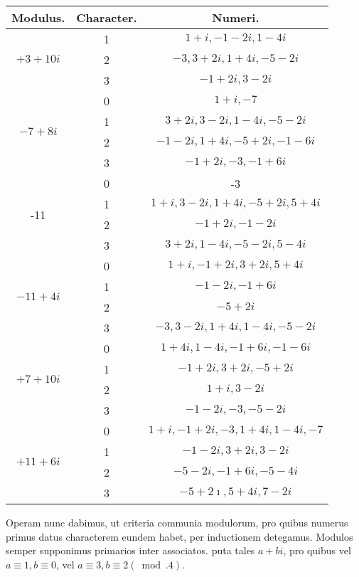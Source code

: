 \documentclass[10pt]{article}
\begin{document}
\begin{center}
\begin{tabular}{|c|c|c|}
\hline
Modulus. & Character. & Numeri. \\
\hline
\multirow[t]{3}{*}{\(+3+10 i\)} & 1 & \(1+i,-1-2 i, 1-4 i\) \\
\hline
 & 2 & \(-3,3+2 i, 1+4 i,-5-2 i\) \\
\hline
 & 3 & \(-1+2 i, 3-2 i\) \\
\hline
\multirow[t]{4}{*}{\(-7+8 i\)} & 0 & \(1+i,-7\) \\
\hline
 & 1 & \(3+2 i, 3-2 i, 1-4 i,-5-2 i\) \\
\hline
 & 2 & \(-1-2 i, 1+4 i,-5+2 i,-1-6 i\) \\
\hline
 & 3 & \(-1+2 i,-3,-1+6 i\) \\
\hline
\multirow[t]{4}{*}{-11} & 0 & -3 \\
\hline
 & 1 & \(1+i, 3-2 i, 1+4 i,-5+2 i, 5+4 i\) \\
\hline
 & 2 & \(-1+2 i,-1-2 i\) \\
\hline
 & 3 & \(3+2 i, 1-4 i,-5-2 i, 5-4 i\) \\
\hline
\multirow[t]{4}{*}{\(-11+4 i\)} & 0 & \(1+i,-1+2 i, 3+2 i, 5+4 i\) \\
\hline
 & 1 & \(-1-2 i,-1+6 i\) \\
\hline
 & 2 & \(-5+2 i\) \\
\hline
 & 3 & \(-3,3-2 i, 1+4 i, 1-4 i,-5-2 i\) \\
\hline
\multirow[t]{4}{*}{\(+7+10 i\)} & 0 & \(1+4 i, 1-4 i,-1+6 i,-1-6 i\) \\
\hline
 & 1 & \(-1+2 i, 3+2 i,-5+2 i\) \\
\hline
 & 2 & \(1+i, 3-2 i\) \\
\hline
 & 3 & \(-1-2 i,-3,-5-2 i\) \\
\hline
\multirow[t]{4}{*}{\(+11+6 i\)} & 0 & \(1+i,-1+2 i,-3,1+4 i, 1-4 i,-7\) \\
\hline
 & 1 & \(-1-2 i, 3+2 i, 3-2 i\) \\
\hline
 & 2 & \(-5-2 i,-1+6 i,-5-4 i\) \\
\hline
 & 3 & \(-5+2 \imath, 5+4 i, 7-2 i\) \\
\hline
\end{tabular}
\end{center}

Operam nunc dabimus, ut criteria communia modulorum, pro quibus numerus primus datus characterem eundem habet, per inductionem detegamus. Modulos semper supponimus primarios inter associatos. puta tales \(a+b i\), pro quibus vel \(a \equiv 1, b \equiv 0\), vel \(a \equiv 3, b \equiv 2(\bmod .4)\).
\end{document}
